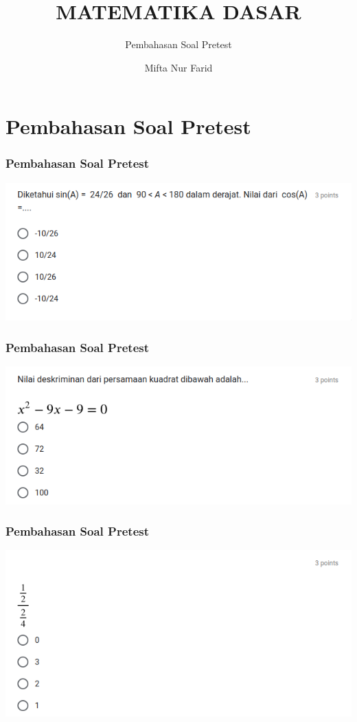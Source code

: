 \documentclass[pdflatex,compress,mathserif]{beamer}
\title{MATEMATIKA DASAR}
\subtitle{Pembahasan Soal Pretest}
\author{Mifta Nur Farid}
\begin{document}
	
	\maketitle
	
	\section{Pembahasan Soal Pretest}

	\begin{frame}
		\frametitle{Pembahasan Soal Pretest}
		\begin{center}
			\includegraphics[width=\linewidth]{img/img01}
		\end{center}
	\end{frame}
	
	\begin{frame}
		\frametitle{Pembahasan Soal Pretest}
		\begin{center}
			\includegraphics[width=\linewidth]{img/img02}
		\end{center}
	\end{frame}
	
	\begin{frame}
		\frametitle{Pembahasan Soal Pretest}
		\begin{center}
			\includegraphics[width=\linewidth]{img/img03}
		\end{center}
	\end{frame}
	
\end{document}
